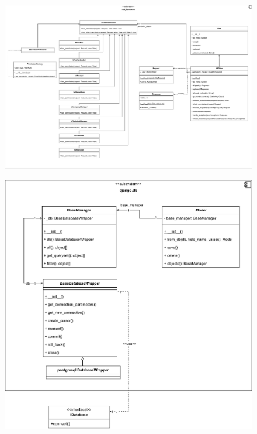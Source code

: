\eject \pdfpagewidth=16in \pdfpageheight=12in
\begin{figure}[ht!]
	\centering
	\includegraphics[scale=0.8]{figs/design-class/rest.pdf}
\end{figure}
\FloatBarrier
\newpage

\recalctypearea

\begin{figure}[ht!]
	\centering
	\includegraphics[scale=0.8]{figs/design-class/db.pdf}
\end{figure}
\FloatBarrier
\newpage

